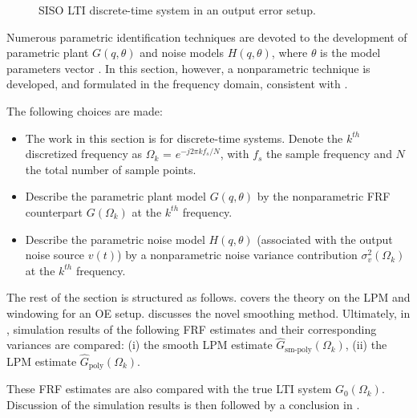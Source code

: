 \begin{figure}
\centering
\setlength{}
\setlength\figureheight{0.68\figurewidth}

\caption{SISO LTI discrete-time system in an output error setup.}
\label{lpmtdrep}
\end{figure}

Numerous parametric identification techniques are devoted to the development of parametric plant $G(q,\theta)$ and noise models  $H(q,\theta)$, where  $\theta$ is the model parameters vector  \citep{Ljung1999,Soderstrom1989}. 
In this section, however, a nonparametric technique is developed, and formulated in the frequency domain, consistent with \citep{Pintelon2012,Mahata2006}. 

The following  choices are made:

\begin{itemize}

\item The work in this section is for discrete-time systems. Denote the $k^{th}$ discretized frequency as $\Omega_k$ = $e^{-j2{\pi}kf_s/N}$, with $f_s$ the sample frequency and $N$ the total number of sample points.

\item  Describe the parametric plant model  $G(q,\theta)$ by the nonparametric \gls{FRF} counterpart  $G(\Omega_k)$  at the $k^{th}$ frequency.

\item Describe  the parametric noise model $H(q,\theta)$ (associated with the output noise source $v(t)$) by a nonparametric noise variance contribution $\sigma^2_v(\Omega_k)$ at the $k^{th}$ frequency.

\end{itemize}

The rest of the section is structured as follows. 
 covers the theory on the \gls{LPM} and windowing for an \gls{OE} setup.
 discusses the novel smoothing method.
Ultimately, in , simulation results of the following FRF estimates and their corresponding variances are compared: (i) the smooth \gls{LPM} estimate $\hat{G}_\text{sm-poly}(\Omega_k)$, (ii) the \gls{LPM} estimate $\hat{G}_\text{poly}(\Omega_k)$.

These FRF estimates are also compared with the true \gls{LTI} system ${G}_0(\Omega_k)$.
Discussion of the simulation results is then followed by a conclusion in .

